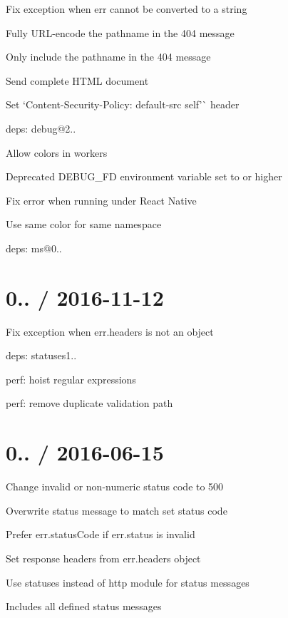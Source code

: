 \begin{DoxyItemize}
\item Fix exception when {\ttfamily err} cannot be converted to a string
\item Fully U\+R\+L-\/encode the pathname in the 404 message
\item Only include the pathname in the 404 message
\item Send complete H\+T\+ML document
\item Set `Content-\/\+Security-\/\+Policy\+: default-\/src \textquotesingle{}self'\`{} header
\item deps\+: debug@2..
\begin{DoxyItemize}
\item Allow colors in workers
\item Deprecated {\ttfamily D\+E\+B\+U\+G\+\_\+\+FD} environment variable set to {} or higher
\item Fix error when running under React Native
\item Use same color for same namespace
\item deps\+: ms@0..
\end{DoxyItemize}
\end{DoxyItemize}

\section*{0.. / 2016-\/11-\/12 }


\begin{DoxyItemize}
\item Fix exception when {\ttfamily err.\+headers} is not an object
\item deps\+: statuses1..
\item perf\+: hoist regular expressions
\item perf\+: remove duplicate validation path
\end{DoxyItemize}

\section*{0.. / 2016-\/06-\/15 }


\begin{DoxyItemize}
\item Change invalid or non-\/numeric status code to 500
\item Overwrite status message to match set status code
\item Prefer {\ttfamily err.\+status\+Code} if {\ttfamily err.\+status} is invalid
\item Set response headers from {\ttfamily err.\+headers} object
\item Use {\ttfamily statuses} instead of {\ttfamily http} module for status messages
\begin{DoxyItemize}
\item Includes all defined status messages
\end{DoxyItemize}
\end{DoxyItemize}

